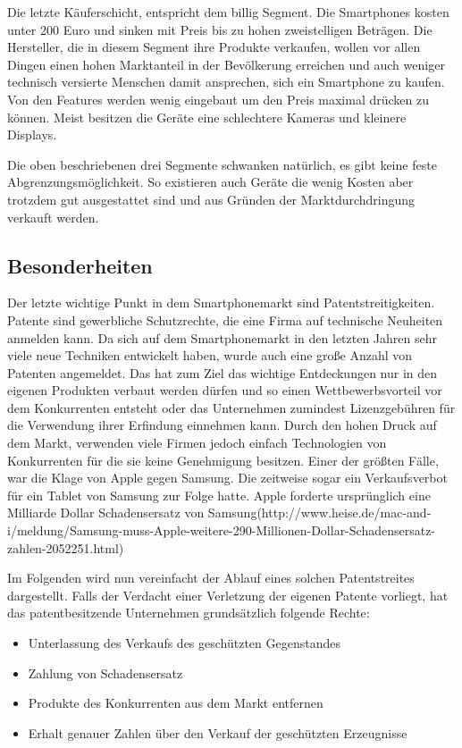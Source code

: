 Die letzte Käuferschicht, entspricht dem billig Segment. Die Smartphones kosten unter 200 Euro und sinken mit Preis bis zu hohen zweistelligen Beträgen. Die Hersteller, die in diesem Segment ihre Produkte verkaufen, wollen vor allen Dingen einen hohen Marktanteil in der Bevölkerung erreichen und auch weniger technisch versierte Menschen damit ansprechen, sich ein Smartphone zu kaufen. Von den Features werden wenig eingebaut um den Preis maximal drücken zu können. Meist besitzen die Geräte eine schlechtere Kameras  und kleinere Displays.

Die oben beschriebenen drei Segmente schwanken natürlich, es gibt keine feste Abgrenzungsmöglichkeit. So existieren auch Geräte die wenig Kosten aber trotzdem gut ausgestattet sind und aus Gründen der Marktdurchdringung verkauft werden.



\subsection{Besonderheiten}
Der letzte wichtige Punkt in dem Smartphonemarkt sind Patentstreitigkeiten. Patente sind gewerbliche Schutzrechte, die eine Firma auf technische Neuheiten anmelden kann. Da sich auf dem Smartphonemarkt in den letzten Jahren sehr viele neue Techniken entwickelt haben, wurde auch eine große Anzahl von Patenten angemeldet. Das hat zum Ziel das wichtige Entdeckungen nur in den eigenen Produkten verbaut werden dürfen und so einen Wettbewerbsvorteil vor dem Konkurrenten entsteht oder das Unternehmen zumindest Lizenzgebühren für die Verwendung ihrer Erfindung einnehmen kann.  Durch den hohen Druck auf dem Markt, verwenden viele Firmen jedoch einfach Technologien von Konkurrenten für die sie keine Genehmigung besitzen. Einer der größten Fälle, war die Klage von Apple gegen Samsung. Die zeitweise sogar ein Verkaufsverbot für ein Tablet von Samsung zur Folge hatte. Apple forderte ursprünglich eine Milliarde Dollar Schadensersatz von Samsung(http://www.heise.de/mac-and-i/meldung/Samsung-muss-Apple-weitere-290-Millionen-Dollar-Schadensersatz-zahlen-2052251.html)

Im Folgenden wird nun vereinfacht der Ablauf eines solchen Patentstreites dargestellt.
Falls der Verdacht einer Verletzung der eigenen Patente vorliegt,  hat das patentbesitzende  Unternehmen grundsätzlich folgende Rechte:
\begin{itemize}
\item  Unterlassung des Verkaufs des geschützten Gegenstandes
\item  Zahlung von Schadensersatz
\item  Produkte des Konkurrenten aus dem Markt entfernen
\item  Erhalt genauer Zahlen über den Verkauf der geschützten Erzeugnisse
\end{itemize}

